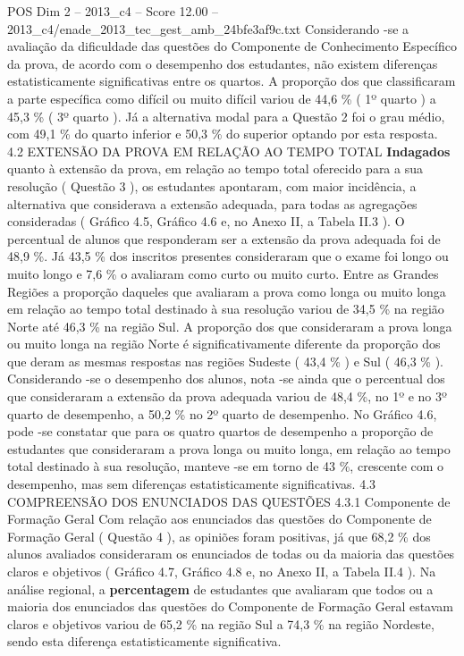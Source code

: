 \begin{textsample}{POS Dim 2 – 2013\_c4 – Score 12.00 – 2013\_c4/enade\_2013\_tec\_gest\_amb\_24bfe3af9c.txt}
Considerando -se a avaliação da dificuldade das questões do Componente de Conhecimento Específico da prova, de acordo com o desempenho dos estudantes, não existem diferenças estatisticamente significativas entre os quartos.
A proporção dos que classificaram a parte específica como difícil ou muito difícil variou de 44,6 \% ( 1º quarto ) a 45,3 \% ( 3º quarto ).
Já a alternativa modal para a Questão 2 foi o grau médio, com 49,1 \% do quarto inferior e 50,3 \% do superior optando por esta resposta. 4.2 EXTENSÃO DA PROVA EM RELAÇÃO AO TEMPO TOTAL \textbf{Indagados} quanto à extensão da prova, em relação ao tempo total oferecido para a sua resolução ( Questão 3 ), os estudantes apontaram, com maior incidência, a alternativa que considerava a extensão adequada, para todas as agregações consideradas ( Gráfico 4.5, Gráfico 4.6 e, no Anexo II, a Tabela II.3 ).
O percentual de alunos que responderam ser a extensão da prova adequada foi de 48,9 \%.
Já 43,5 \% dos inscritos presentes consideraram que o exame foi longo ou muito longo e 7,6 \% o avaliaram como curto ou muito curto.
Entre as Grandes Regiões a proporção daqueles que avaliaram a prova como longa ou muito longa em relação ao tempo total destinado à sua resolução variou de 34,5 \% na região Norte até 46,3 \% na região Sul.
A proporção dos que consideraram a prova longa ou muito longa na região Norte é significativamente diferente da proporção dos que deram as mesmas respostas nas regiões Sudeste ( 43,4 \% ) e Sul ( 46,3 \% ).
Considerando -se o desempenho dos alunos, nota -se ainda que o percentual dos que consideraram a extensão da prova adequada variou de 48,4 \%, no 1º e no 3º quarto de desempenho, a 50,2 \% no 2º quarto de desempenho.
No Gráfico 4.6, pode -se constatar que para os quatro quartos de desempenho a proporção de estudantes que consideraram a prova longa ou muito longa, em relação ao tempo total destinado à sua resolução, manteve -se em torno de 43 \%, crescente com o desempenho, mas sem diferenças estatisticamente significativas. 4.3 COMPREENSÃO DOS ENUNCIADOS DAS QUESTÕES 4.3.1 Componente de Formação Geral Com relação aos enunciados das questões do Componente de Formação Geral ( Questão 4 ), as opiniões foram positivas, já que 68,2 \% dos alunos avaliados consideraram os enunciados de todas ou da maioria das questões claros e objetivos ( Gráfico 4.7, Gráfico 4.8 e, no Anexo II, a Tabela II.4 ).
Na análise regional, a \textbf{percentagem} de estudantes que avaliaram que todos ou a maioria dos enunciados das questões do Componente de Formação Geral estavam claros e objetivos variou de 65,2 \% na região Sul a 74,3 \% na região Nordeste, sendo esta diferença estatisticamente significativa.

\end{textsample}
